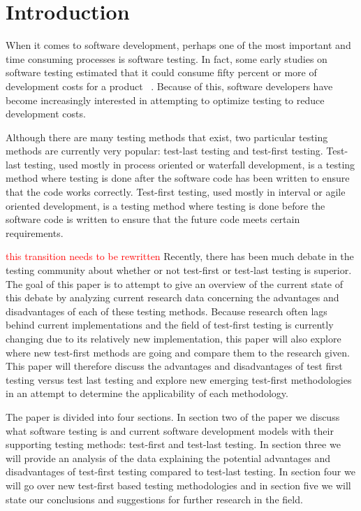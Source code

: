 \documentclass{sig-alternate}
\newcommand{\mycomment}[1]{\textcolor{red}{#1}}
\begin{document}


\section{Introduction}
When it comes to software development, perhaps one of the most important and time consuming processes is software testing.  In fact, some early studies on software testing estimated that it could consume fifty percent or more of development costs for a product ~\cite{Bertolino:2007}.  Because of this, software developers have become increasingly interested in attempting to optimize testing to reduce development costs.

Although there are many testing methods that  exist, two particular testing methods are currently very popular: test-last testing and test-first testing.  Test-last testing, used mostly in process oriented or waterfall development, is a testing method where testing is done after the software code has been written to ensure that the code works correctly.  Test-first testing, used mostly in interval or agile oriented development, is a testing method where testing is done before the software code is written to ensure that the future code meets certain requirements.

\mycomment{this transition needs to be rewritten}
Recently, there has been much debate in the testing community about whether or not test-first or test-last testing is superior.  The goal of this paper is to attempt to give an overview of the current state of this debate by analyzing current research data concerning the advantages and disadvantages of each of these testing methods.  Because research often lags behind current implementations and the field of test-first testing is currently changing due to its relatively new implementation, this paper will also explore where new test-first methods are going and compare them to the research given.  This paper will therefore discuss the advantages and disadvantages of test first testing versus test last testing and explore new emerging test-first methodologies in an attempt to determine the applicability of each methodology.

The paper is divided into four sections.  In section two of the paper we discuss what software testing is and current software development models with their supporting testing methods: test-first and test-last testing.  In section three we will provide an analysis of the data explaining the potential advantages and disadvantages of test-first testing compared to test-last testing.  In section four we will go over new test-first based testing methodologies and in section five we will state our conclusions and suggestions for further research in the field.
\end{document}
